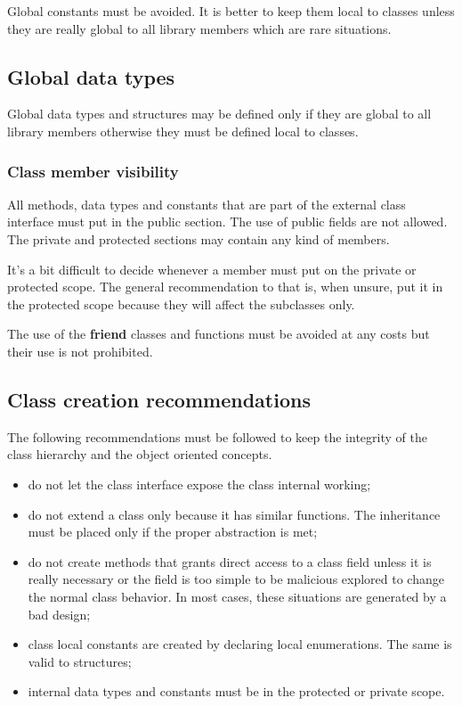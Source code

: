 Global constants must be avoided. It is better to keep them local to classes unless they are really global to all library members which are rare situations.

\subsection{Global data types}

Global data types and structures may be defined only if they are global to all library members otherwise they must be defined local to classes.

\subsubsection{Class member visibility}

All methods, data types and constants that are part of the external class interface must put in the public section. The use of public fields are not allowed. The private and protected sections may contain any kind of members.

It's a bit difficult to decide whenever a member must put on the private or protected scope. The general recommendation to that is, when unsure, put it in the protected scope because they will affect the subclasses only.

The use of the {\bf friend} classes and functions must be avoided at any costs but their use is not prohibited.

\subsection{Class creation recommendations}

The following recommendations must be followed to keep the integrity of the class hierarchy and the object oriented concepts.

\begin{itemize}
	\item do not let the class interface expose the class internal working;
	\item do not extend a class only because it has similar functions. The inheritance must be placed only if the proper abstraction is met;
	\item do not create methods that grants direct access to a class field unless it is really necessary or the field is too simple to be malicious explored to change the normal class behavior. In most cases, these situations are generated by a bad design;
	\item class local constants are created by declaring local enumerations. The same is valid to structures;
	\item internal data types and constants must be in the protected or private scope.
\end{itemize}

